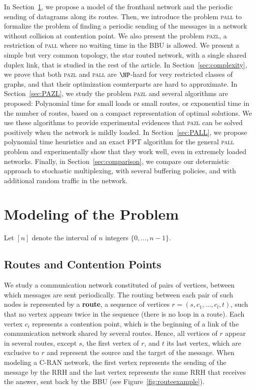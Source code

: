 \documentclass[a4paper,10pt]{journal}
\newcommand\pazl{\textsc{pazl}\xspace}
\newcommand\pall{\textsc{pall}\xspace}
\begin{document}
 In Section~\ref{sec:def}, we propose a model of the fronthaul network and the periodic sending of datagrams along its routes. Then, we introduce the problem \pall to formalize the problem of finding a periodic sending of the messages in a network without collision at contention point. We also present the problem \pazl, a restriction of \pall where no waiting time in the BBU is allowed. We present a simple but very common topology, the star routed network, with a single shared duplex link, that is studied in the rest of the article.  In Section~\ref{sec:complexity}, we prove that both \pazl and \pall are $\NP$-hard for very restricted classes of graphs, and that their optimization counterparts are hard to approximate. 
 In Section~\ref{sec:PAZL}, we study the problem \pazl and several algorithms are proposed: Polynomial time for small loads or small routes, or exponential time in the number of routes, based on a compact representation of optimal solutions. We use these algorithms to provide experimental evidences that \pazl can be solved positively when the network is mildly loaded. In Section~\ref{sec:PALL}, we propose polynomial time heuristics and an exact FPT algorithm for the general \pall problem and experimentally show that they work well, even in extremely loaded networks. 
Finally, in Section~\ref{sec:comparison}, we compare our determistic approach to stochastic multiplexing, with several buffering policies, and with additional random traffic in the network.



\section{Modeling of the Problem}\label{sec:def}

Let $[n]$ denote the interval of $n$ integers $\{0,\dots,n-1\}$.


	\subsection{Routes and Contention Points}

  	We study a communication network constituted of pairs of vertices, between which messages are sent periodically. The routing between each pair of such nodes is represented by a \textbf{route}, a sequence of vertices $r=(s, c_1, \ldots, c_l, t)$, such that no vertex appears twice in the sequence (there is no loop in a route). Each vertex $c_i$ represents a contention point, which is the beginning of a link of the communication network shared by several routes. Hence, all vertices of $r$ appear in several routes, except $s$, the first vertex of $r$, and $t$ its last vertex, which are exclusive to $r$ and represent the source and the target of the message. When modeling a C-RAN network, the first vertex represents the sending of the message by the RRH and the last vertex represents the same RRH that receives the answer, sent back by the BBU (see Figure~\ref{fig:routeexample}).
\end{document}
